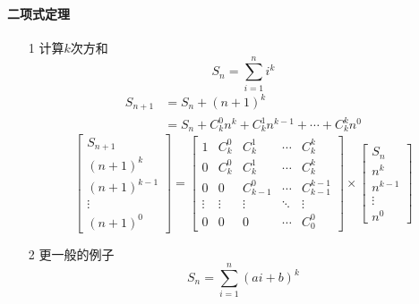 \paragraph{二项式定理}
\begin{itemize}
    \item[1] 计算$k$次方和 
        \begin{equation*}
            S_n=\sum_{i=1}^{n}{i^k}
        \end{equation*}
        \begin{align*}
            S_{n+1}&=S_n+(n+1)^k\\
            &=S_n+C_{k}^{0}n^k+C_{k}^{1}n^{k-1}+\cdots+C_{k}^{k}n^0
        \end{align*}
        \begin{equation*}
            \left[
            \begin{matrix}
                S_{n+1}\\
                (n+1)^k\\
                (n+1)^{k-1}\\
                \vdots\\
                (n+1)^0
            \end{matrix}
            \right]
            =
            \left[
            \begin{matrix}
                1&C_{k}^{0}&C_{k}^1&\cdots&C_{k}^{k}\\
                0&C_{k}^{0}&C_{k}^1&\cdots&C_{k}^{k}\\
                0&0&C_{k-1}^0&\cdots&C_{k-1}^{k-1}\\
                \vdots&\vdots&\vdots&\ddots&\vdots\\
                0&0&0&\cdots&C_0^0    
            \end{matrix}
            \right]
            \times
            \left[
            \begin{matrix}
                S_{n}\\
                n^k\\
                n^{k-1}\\
                \vdots\\
                n^0
            \end{matrix}
            \right]
        \end{equation*}
    \item[2] 更一般的例子
        \begin{equation*}
            S_{n}=\sum_{i=1}^{n}(a i+b)^{k}
        \end{equation*}

\end{itemize}
